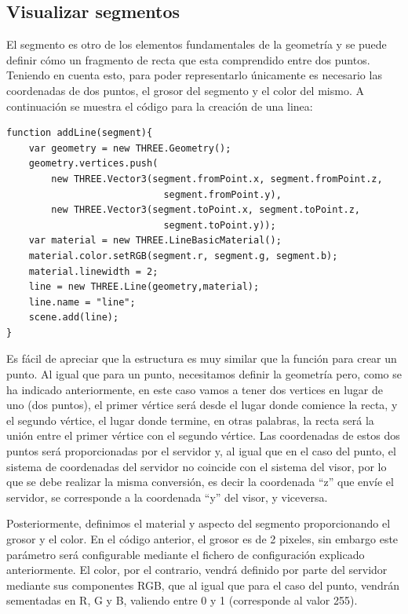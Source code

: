 \subsection{Visualizar segmentos}
El segmento es otro de los elementos fundamentales de la geometría y se puede definir cómo un fragmento de recta que esta comprendido entre dos puntos. Teniendo en cuenta esto, para poder representarlo únicamente es necesario las coordenadas de dos puntos, el grosor del segmento y el color del mismo. A continuación se muestra el código para la creación de una linea:
\begin{lstlisting}[frame=single]
function addLine(segment){
	var geometry = new THREE.Geometry();
	geometry.vertices.push(
		new THREE.Vector3(segment.fromPoint.x, segment.fromPoint.z, 
							segment.fromPoint.y),
		new THREE.Vector3(segment.toPoint.x, segment.toPoint.z, 
							segment.toPoint.y));
	var material = new THREE.LineBasicMaterial();
	material.color.setRGB(segment.r, segment.g, segment.b);
	material.linewidth = 2;
	line = new THREE.Line(geometry,material);
	line.name = "line";
	scene.add(line);
}
\end{lstlisting}
Es fácil de apreciar que la estructura es muy similar que la función para crear un punto. Al igual que para un punto, necesitamos definir la geometría pero, como se ha indicado anteriormente, en este caso vamos a tener dos vertices en lugar de uno (dos puntos), el primer vértice será desde el lugar donde comience la recta, y el segundo vértice, el lugar donde termine, en otras palabras, la recta será la unión entre el primer vértice con el segundo vértice. Las coordenadas de estos dos puntos será proporcionadas por el servidor y, al igual que en el caso del punto, el sistema de coordenadas del servidor no coincide con el sistema del visor, por lo que se debe realizar la misma conversión, es decir la coordenada ``z'' que envíe el servidor, se corresponde a la coordenada ``y'' del visor, y viceversa.

Posteriormente, definimos el material y aspecto del segmento proporcionando el grosor y el color. En el código anterior, el grosor es de 2 pixeles, sin embargo este parámetro será configurable mediante el fichero de configuración explicado anteriormente. El color, por el contrario, vendrá definido por parte del servidor mediante sus componentes RGB, que al igual que para el caso del punto, vendrán sementadas en R, G y B, valiendo entre 0  y 1 (corresponde al valor 255).

